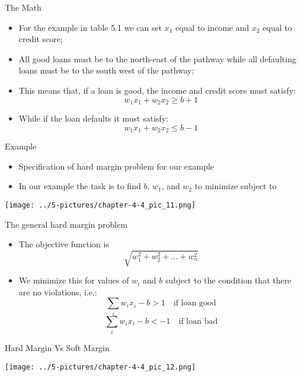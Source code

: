 \documentclass[11pt]{beamer}
\begin{document}
\begin{frame}{The Math}
	\begin{itemize}
		\item For the example in table 5.1 we can set $x_1$ equal to income and $x_2$ equal to credit score;
		\item All good loans must be to the north-east of the pathway while all defaulting loans must be to the south west of the pathway;
		\item This means that, if a loan is good, the income and credit score must satisfy: $$w_1x_1 + w_2x_2 \ge b+1$$
		\item While if the loan defaults it must satisfy: $$ w_1x_1 + w_2x_2 \le b-1 $$
	\end{itemize}
\end{frame}
\begin{frame}{Example}
	\begin{itemize}
		\item Specification of hard margin problem for our example
		\item In our example the task is to find $b$, $w_1$, and $w_2$ to minimize subject to
	\end{itemize}
	\begin{center}
	\texttt{[image: ../5-pictures/chapter-4-4\_pic\_11.png]}
	\end{center}
\end{frame}
\begin{frame}{The general hard margin problem}
	\begin{itemize}
		\item The objective function is $$\sqrt{w_1^2+w_2^2 + \dots + w_n^2}$$
		\item We minimize this for values of $w_i$ and $b$  subject to the condition that there are no violations, i.e.: $$\sum_i w_ix_i - b > 1 \quad \text{if loan good}$$ $$\sum_i w_ix_i - b < -1 \quad \text{if loan bad}$$
	\end{itemize}
\end{frame}
\begin{frame}{Hard Margin Vs Soft Margin}
	\begin{center}
	\texttt{[image: ../5-pictures/chapter-4-4\_pic\_12.png]}
	\end{center}
\end{frame}
\end{document}
